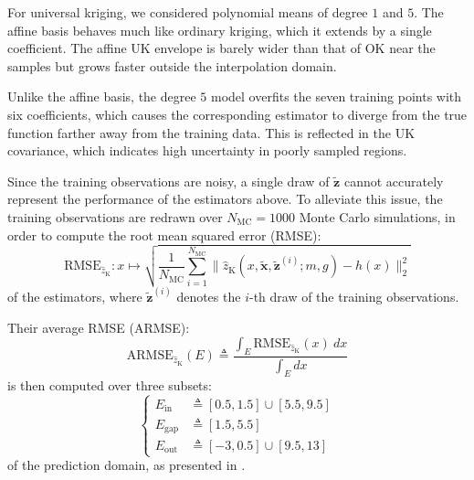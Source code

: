 For universal kriging, we considered polynomial means of degree $1$ and $5$. The affine basis behaves much like ordinary kriging, which it extends by a single coefficient. The affine UK envelope is barely wider than that of OK near the samples but grows faster outside the interpolation domain.

Unlike the affine basis, the degree $5$ model overfits the seven training points with six coefficients, which causes the corresponding estimator to diverge from the true function farther away from the training data. This is reflected in the UK covariance, which indicates high uncertainty in poorly sampled regions.

Since the training observations are noisy, a single draw of $\tilde{\mathbf{z}}$ cannot accurately represent the performance of the estimators above. To alleviate this issue, the training observations are redrawn over $N_\mathrm{MC}=1000$ Monte Carlo simulations, in order to compute the root mean squared error (RMSE):
\begin{equation}
	\mathrm{RMSE}_{\hat{z}_{\mathrm{K}}}:x\mapsto\sqrt{\frac{1}{N_\mathrm{MC}}\sum_{i=1}^{N_\mathrm{MC}}\|\hat{z}_{\mathrm{K}}\left(x,\tilde{\mathbf{x}},\tilde{\mathbf{z}}^{(i)};m,g\right)-h(x)\|_2^2}\label{eq:kriging_RMSE}
\end{equation}
of the estimators, where $\tilde{\mathbf{z}}^{(i)}$ denotes the $i$-th draw of the training observations.

Their average RMSE (ARMSE):
\begin{equation}
	\mathrm{ARMSE}_{\hat{z}_{\mathrm{K}}}(E)\triangleq\frac{\displaystyle\int_E{\mathrm{RMSE}_{\hat{z}_{\mathrm{K}}}(x)\:dx}}{\displaystyle\int_E{dx}}\label{eq:kriging_ARMSE}
\end{equation}
is then computed over three subsets:
\begin{equation}
	\left\{\begin{aligned}
	E_\mathrm{in}&\triangleq[0.5,1.5]\cup[5.5,9.5]\\
	E_\mathrm{gap}&\triangleq[1.5,5.5]\\
	E_\mathrm{out}&\triangleq[-3,0.5]\cup[9.5,13]
	\end{aligned}\right.
\end{equation}
of the prediction domain, as presented in .

\begin{table}[H]
	\centering
	\caption{ARMSE of the five estimators over the three subsets $E_\mathrm{in}$, $E_\mathrm{gap}$, and $E_\mathrm{out}$ of the prediction domain.}\label{tab:kriging_rmse}
\end{table}

